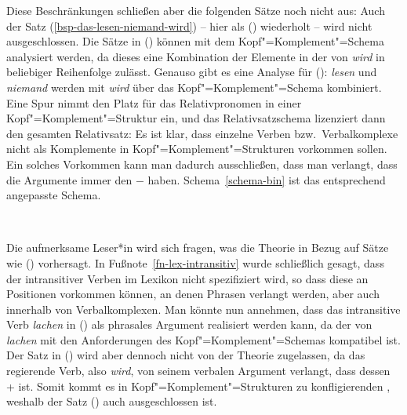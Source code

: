Diese Beschränkungen schließen aber die folgenden Sätze noch nicht aus:
\eal
{}
\zl
Auch der Satz (\ref{bsp-das-lesen-niemand-wird}) -- hier als () wiederholt --
wird nicht ausgeschlossen.
\z
Die Sätze in () können mit dem Kopf"=Komplement"=Schema analysiert werden,
da dieses eine Kombination der Elemente in der \compsl von \emph{wird} in beliebiger
Reihenfolge zulässt. Genauso gibt es eine Analyse für (): \emph{lesen} und \emph{niemand}
werden mit \emph{wird} über das Kopf"=Komplement"=Schema kombiniert. Eine Spur nimmt den Platz
für das Relativpronomen in einer Kopf"=Komplement"=Struktur ein, und das Relativsatzschema lizenziert
dann den gesamten Relativsatz:
\z
\largerpage\enlargethispage{5pt}
Es ist klar, dass einzelne Verben bzw.\ Verbalkomplexe nicht als Komplemente in
Kopf"=Komplement"=Strukturen vorkommen sollen. Ein solches Vorkommen kann man dadurch ausschließen, dass man verlangt,
dass die Argumente immer den \lexw $-$ haben. Schema~\ref{schema-bin} ist
das entsprechend angepasste Schema.

\begin{samepage}
\begin{schema}
\label{schema-bin}
 \impl\\
\onems{
      synsem$|$loc$|$cat$|$comps \ibox{1} $\oplus$ \ibox{3}\\
      head-dtr$|$synsem$|$loc$|$cat$|$comps \ibox{1} $\oplus$ \sliste{ \ibox{2} } $\oplus$ \ibox{3} \\
      non-head-dtrs \nliste{ [ \synsem  \ibox{2} [\textsc{lex}  $-$ ] ] }\\
}
\end{schema}
\end{samepage}

\noindent
Die aufmerksame Leser*in wird sich fragen, was die Theorie in Bezug auf Sätze wie () vorhersagt.%
\z
In Fußnote~\ref{fn-lex-intransitiv} wurde schließlich gesagt, dass der \lexw intransitiver Verben
im Lexikon nicht spezifiziert wird, so dass diese an Positionen vorkommen können, an denen Phrasen
verlangt werden, aber auch innerhalb von Verbalkomplexen. Man könnte nun annehmen, dass das intransitive Verb
\emph{lachen} in () als phrasales Argument realisiert werden kann, da der \lexw von \emph{lachen}
mit den Anforderungen des Kopf"=Komplement"=Schemas kompatibel ist. Der Satz in () wird aber dennoch
nicht von der Theorie zugelassen, da das regierende Verb, also \emph{wird}, von seinem verbalen Argument verlangt,
dass dessen \lexw + ist. Somit kommt es in Kopf"=Komplement"=Strukturen zu konfligierenden \lexwen, 
weshalb der Satz () auch ausgeschlossen ist.


